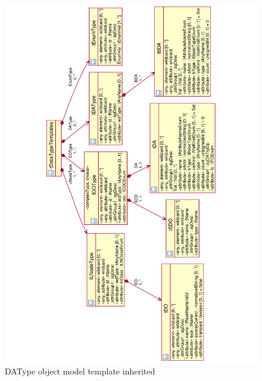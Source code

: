 \begin{landscape}
	\begin{figure}
	  \includegraphics[angle=-90, width=1.0\linewidth]
	  				{chapters/ch-scl/figures/SCL-uml-DATypeTemplate-Deept2-inherited}
	  \caption{DAType object model template inherited}  
	  \label{fig:pdf-SCL-uml-DATypeTemplate-Deept2-inherited}
	\end{figure}
\end{landscape}

